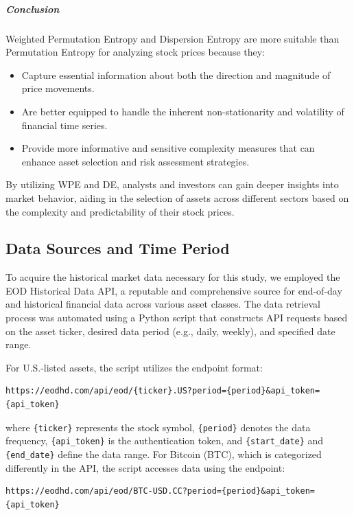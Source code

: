 \subparagraph{Conclusion}
Weighted Permutation Entropy and Dispersion Entropy are more suitable than Permutation Entropy for analyzing stock prices because they:

\begin{itemize} \item Capture essential information about both the direction and magnitude of price movements. \item Are better equipped to handle the inherent non-stationarity and volatility of financial time series. \item Provide more informative and sensitive complexity measures that can enhance asset selection and risk assessment strategies. \end{itemize}

By utilizing WPE and DE, analysts and investors can gain deeper insights into market behavior, aiding in the selection of assets across different sectors based on the complexity and predictability of their stock prices.
\subsection{Data Sources and Time Period}


To acquire the historical market data necessary for this study, we employed the EOD Historical Data API, a reputable and comprehensive source for end-of-day and historical financial data across various asset classes. The data retrieval process was automated using a Python script that constructs API requests based on the asset ticker, desired data period (e.g., daily, weekly), and specified date range.

For U.S.-listed assets, the script utilizes the endpoint format:

\begin{verbatim}
https://eodhd.com/api/eod/{ticker}.US?period={period}&api_token={api_token}
\end{verbatim}

where \texttt{\{ticker\}} represents the stock symbol, \texttt{\{period\}} denotes the data frequency, \texttt{\{api\_token\}} is the authentication token, and \texttt{\{start\_date\}} and \texttt{\{end\_date\}} define the data range. For Bitcoin (BTC), which is categorized differently in the API, the script accesses data using the endpoint:

\begin{verbatim}
https://eodhd.com/api/eod/BTC-USD.CC?period={period}&api_token={api_token}
\end{verbatim}


